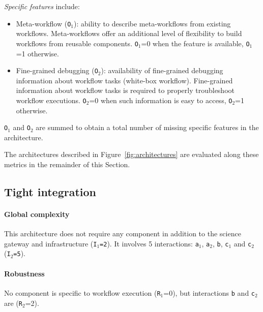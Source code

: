 \documentclass[preprint,3p,twocolumn]{elsarticle}
\begin{document}
\emph{Specific features} include:
\begin{itemize}[leftmargin=0cm,itemindent=0.35cm,itemsep=0cm]
\item Meta-workflow (\texttt{O$_1$}): ability to describe
  meta-workflows from existing workflows. Meta-workflows offer an
  additional level of flexibility to build workflows from reusable
  components. \texttt{O$_1$}=0 when the feature is available,
  \texttt{O$_1$}=1 otherwise.
\item Fine-grained debugging (\texttt{O$_2$}): availability of
  fine-grained debugging information about workflow tasks (white-box
  workflow).  Fine-grained information about workflow tasks is
  required to properly troubleshoot workflow executions.
  \texttt{O$_2$}=0 when such information is easy to access,
  \texttt{O$_2$}=1 otherwise.
\end{itemize}
\texttt{O$_1$} and \texttt{O$_2$} are summed to obtain a total number of missing specific
features in the architecture.


The architectures described in Figure~\ref{fig:architectures} are
evaluated along these metrics in the remainder of this Section.

\subsection{Tight integration}

\paragraph{Global complexity} This architecture does not require any
component in addition to the science gateway and infrastructure
(\texttt{I$_1$=2}). It involves 5 interactions: \texttt{a$_1$},
\texttt{a$_2$}, \texttt{b}, \texttt{c$_1$} and \texttt{c$_2$}
(\texttt{I$_2$=5}).

\paragraph{Robustness} No component is specific to workflow execution
(\texttt{R$_1$}=0), but interactions \texttt{b} and \texttt{c$_2$} are
(\texttt{R$_2$}=2).
\end{document}
